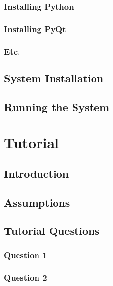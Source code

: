 \subsubsection{Installing Python}

\subsubsection{Installing PyQt}

\subsubsection{Etc.}

\subsection{System Installation}

\subsection{Running the System}

\section{Tutorial}

\subsection{Introduction}

\subsection{Assumptions}

\subsection{Tutorial Questions}

\subsubsection{Question 1}

\subsubsection{Question 2}

